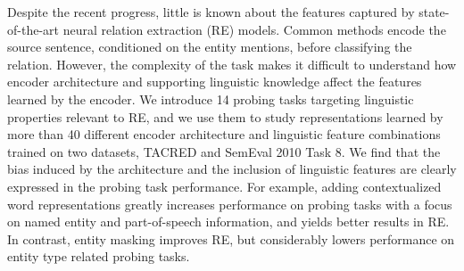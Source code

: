Despite the recent progress, little is known about the features captured by state-of-the-art neural relation extraction (RE) models. Common methods encode the source sentence, conditioned on the entity mentions, before classifying the relation. However, the complexity of the task makes it difficult to understand how encoder architecture and supporting linguistic knowledge affect the features learned by the encoder. We introduce 14 probing tasks targeting linguistic properties relevant to RE, and we use them to study representations learned by more than 40 different encoder architecture and linguistic feature combinations trained on two datasets, TACRED and SemEval 2010 Task 8. We find that the bias induced by the architecture and the inclusion of linguistic features are clearly expressed in the probing task performance. For example, adding contextualized word representations greatly increases performance on probing tasks with a focus on named entity and part-of-speech information, and yields better results in RE. In contrast, entity masking improves RE, but considerably lowers performance on entity type related probing tasks.

